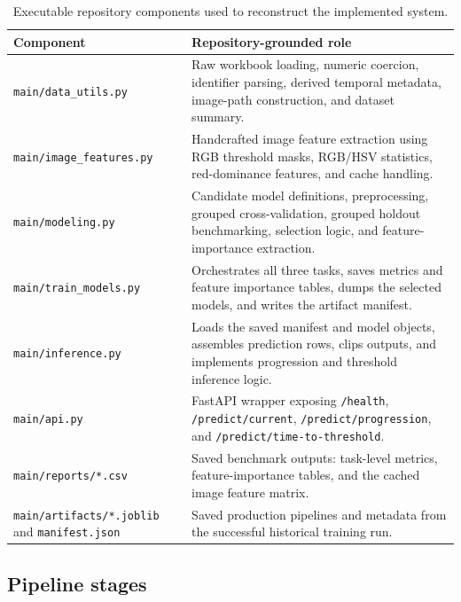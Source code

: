 \documentclass[11pt]{article}
\begin{document}
\begin{table}[H]
\centering
\small
\begin{tabularx}{\textwidth}{p{} p{}}
\toprule
\textbf{Component} & \textbf{Repository-grounded role} \\
\midrule
\texttt{main/data\_utils.py} & Raw workbook loading, numeric coercion, identifier parsing, derived temporal metadata, image-path construction, and dataset summary. \\
\texttt{main/image\_features.py} & Handcrafted image feature extraction using RGB threshold masks, RGB/HSV statistics, red-dominance features, and cache handling. \\
\texttt{main/modeling.py} & Candidate model definitions, preprocessing, grouped cross-validation, grouped holdout benchmarking, selection logic, and feature-importance extraction. \\
\texttt{main/train\_models.py} & Orchestrates all three tasks, saves metrics and feature importance tables, dumps the selected models, and writes the artifact manifest. \\
\texttt{main/inference.py} & Loads the saved manifest and model objects, assembles prediction rows, clips outputs, and implements progression and threshold inference logic. \\
\texttt{main/api.py} & FastAPI wrapper exposing \texttt{/health}, \texttt{/predict/current}, \texttt{/predict/progression}, and \texttt{/predict/time-to-threshold}. \\
\texttt{main/reports/*.csv} & Saved benchmark outputs: task-level metrics, feature-importance tables, and the cached image feature matrix. \\
\texttt{main/artifacts/*.joblib} and \texttt{manifest.json} & Saved production pipelines and metadata from the successful historical training run. \\
\bottomrule
\end{tabularx}
\caption{Executable repository components used to reconstruct the implemented system.}
\label{tab:repo_components}
\end{table}

\subsection{Pipeline stages}
\end{document}

